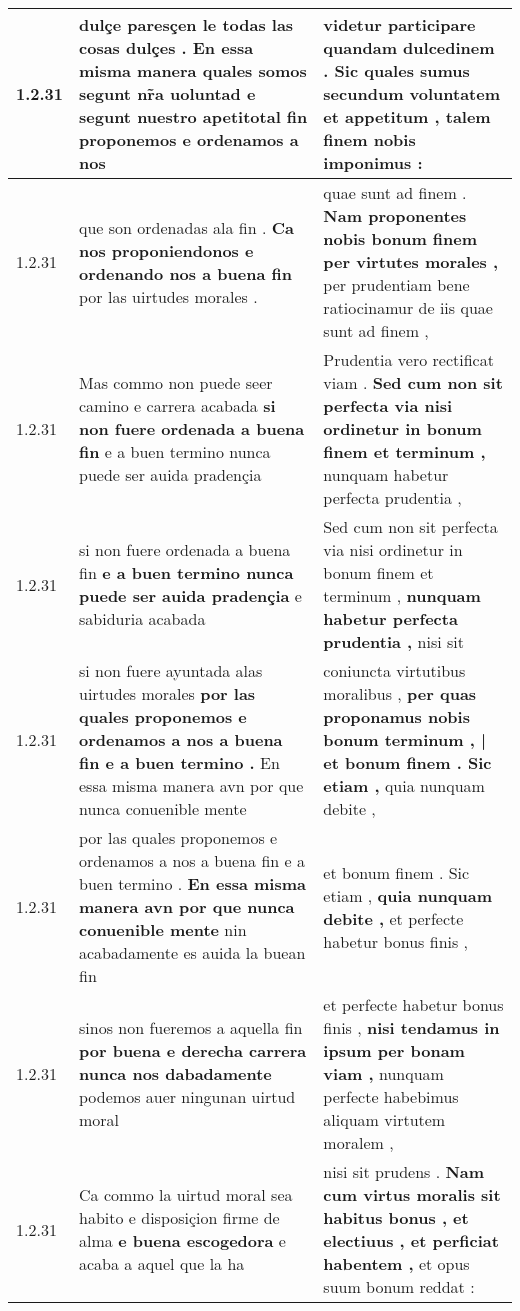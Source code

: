 \begin{tabular}{|p{1cm}|p{6.5cm}|p{6.5cm}|}
1.2.31 & dulçe paresçen le todas las cosas dulçes . En essa misma manera quales somos segunt nr̃a uoluntad \textbf{ e segunt nuestro apetitotal fin proponemos } e ordenamos a nos & videtur participare quandam dulcedinem . Sic quales sumus \textbf{ secundum voluntatem } et appetitum , talem finem nobis imponimus : \\\hline
1.2.31 & que son ordenadas ala fin . \textbf{ Ca nos proponiendonos e ordenando nos a buena fin } por las uirtudes morales . & quae sunt ad finem . \textbf{ Nam proponentes nobis bonum finem per virtutes morales , } per prudentiam bene ratiocinamur de iis quae sunt ad finem , \\\hline
1.2.31 & Mas commo non puede seer camino e carrera acabada \textbf{ si non fuere ordenada a buena fin } e a buen termino nunca puede ser auida pradençia & Prudentia vero rectificat viam . \textbf{ Sed cum non sit perfecta via nisi ordinetur in bonum finem et terminum , } nunquam habetur perfecta prudentia , \\\hline
1.2.31 & si non fuere ordenada a buena fin \textbf{ e a buen termino nunca puede ser auida pradençia } e sabiduria acabada & Sed cum non sit perfecta via nisi ordinetur in bonum finem et terminum , \textbf{ nunquam habetur perfecta prudentia , } nisi sit \\\hline
1.2.31 & si non fuere ayuntada alas uirtudes morales \textbf{ por las quales proponemos e ordenamos a nos a buena fin e a buen termino . } En essa misma manera avn por que nunca conuenible mente & coniuncta virtutibus moralibus , \textbf{ per quas proponamus nobis bonum terminum , | et bonum finem . Sic etiam , } quia nunquam debite , \\\hline
1.2.31 & por las quales proponemos e ordenamos a nos a buena fin e a buen termino . \textbf{ En essa misma manera avn por que nunca conuenible mente } nin acabadamente es auida la buean fin & et bonum finem . Sic etiam , \textbf{ quia nunquam debite , } et perfecte habetur bonus finis , \\\hline
1.2.31 & sinos non fueremos a aquella fin \textbf{ por buena e derecha carrera nunca nos dabadamente } podemos auer ningunan uirtud moral & et perfecte habetur bonus finis , \textbf{ nisi tendamus in ipsum per bonam viam , } nunquam perfecte habebimus aliquam virtutem moralem , \\\hline
1.2.31 & Ca commo la uirtud moral sea habito e disposiçion firme de alma \textbf{ e buena escogedora } e acaba a aquel que la ha & nisi sit prudens . \textbf{ Nam cum virtus moralis sit habitus bonus , et electiuus , et perficiat habentem , } et opus suum bonum reddat : \\\hline

\end{tabular}
